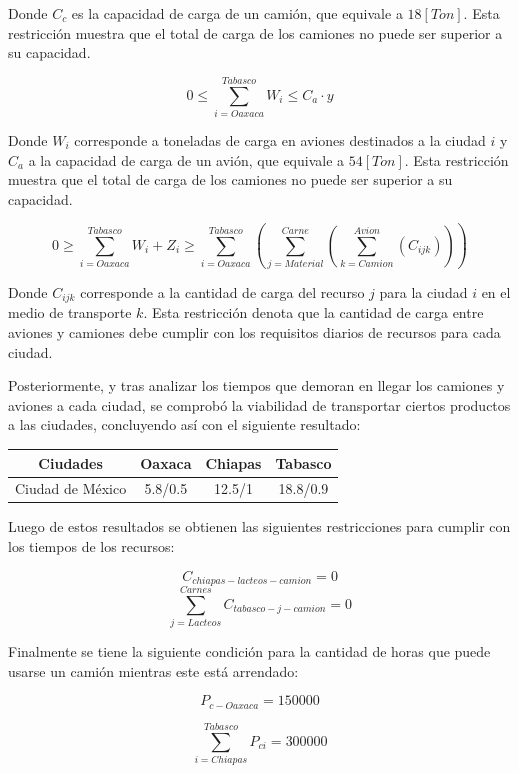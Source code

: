 \documentclass[]{article}
\begin{document}
Donde $C_c$ es la capacidad de carga de un camión, que equivale a $18 [Ton]$. Esta restricción muestra que el total de carga de los camiones no puede ser superior a su capacidad.

$$0\leq \sum_{i=Oaxaca}^{Tabasco}W_i \leq C_a\cdot y$$

Donde $W_i$ corresponde a toneladas de carga en aviones destinados a la ciudad $i$ y $C_a$ a la capacidad de carga de un avión, que equivale a $54 [Ton]$. Esta restricción muestra que el total de carga de los camiones no puede ser superior a su capacidad.

$$0 \geq \sum_{i=Oaxaca}^{Tabasco}{W_i+Z_i} \geq \sum_{i=Oaxaca}^{Tabasco}{\left(\sum_{j=Material}^{Carne}{\left(\sum_{k=Camion}^{Avion}{\left(C_{ijk}\right)}\right)}\right)}$$

Donde $C_{ijk}$ corresponde a la cantidad de carga del recurso $j$ para la ciudad $i$ en el medio de transporte $k$. Esta restricción denota que la cantidad de carga entre aviones y camiones debe cumplir con los requisitos diarios de recursos para cada ciudad.

Posteriormente, y tras analizar los tiempos que demoran en llegar los camiones y aviones a cada ciudad, se comprobó la viabilidad de transportar ciertos productos a las ciudades, concluyendo así con el siguiente resultado:

\begin{table}[!htb]
    \centering
    \begin{tabular}{|c|c|c|c|}\hline %
        \textbf{Ciudades} & \textbf{Oaxaca} & \textbf{Chiapas} & \textbf{Tabasco}\\ \hline
        Ciudad de México & 5.8/0.5 & 12.5/1 & 18.8/0.9 \\ \hline
    \end{tabular}
\end{table}

Luego de estos resultados se obtienen las siguientes restricciones para cumplir con los tiempos de los recursos:

$$C_{chiapas-lacteos-camion}=0$$
$$\sum_{j=Lacteos}^{Carnes}C_{tabasco-j-camion}=0$$

Finalmente se tiene la siguiente condición para la cantidad de horas que puede usarse un camión mientras este está arrendado:

$$P_{c-Oaxaca}=150000$$

$$\sum_{i=Chiapas}^{Tabasco}P_{ci}=300000$$
\end{document}
